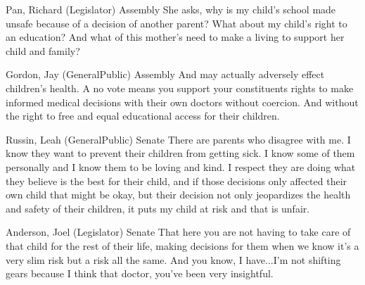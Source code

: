 \begin{result}{15.03620730889844}{Pan, Richard (Legislator) Assembly}
She asks, why is my child's school made unsafe because of a decision of another parent? What about my child's right to an education? And what of this mother's need to make a living to support her child and family?
\end{result}

\begin{result}{14.527732171017536}{Gordon, Jay (GeneralPublic) Assembly}
And may actually adversely effect children's health. A no vote means you support your constituents rights to make informed medical decisions with their own doctors without coercion. And without the right to free and equal educational access for their children.
\end{result}

\begin{result}{14.1432066442995}{Russin, Leah (GeneralPublic) Senate}
There are parents who disagree with me. I know they want to prevent their children from getting sick. I know some of them personally and I know them to be loving and kind. I respect they are doing what they believe is the best for their child, and if those decisions only affected their own child that might be okay, but their decision not only jeopardizes the health and safety of their children, it puts my child at risk and that is unfair.
\end{result}

\begin{result}{12.773276729732682}{Anderson, Joel (Legislator) Senate}
That here you are not having to take care of that child for the rest of their life, making decisions for them when we know it's a very slim risk but a risk all the same. And you know, I have...I'm not shifting gears because I think that doctor, you've been very insightful.
\end{result}

